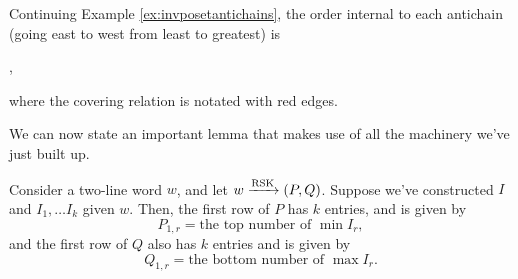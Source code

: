 \documentclass{article}
\DeclareMathOperator{\RSK}{RSK}
\newcommand{\rskarrow}{\ensuremath\xrightarrow{\RSK}}
\begin{document}
\begin{example}
    Continuing Example \ref{ex:invposetantichains}, the order internal to each antichain (going east to west from least to greatest) is
    \begin{center}
        ,
    \end{center}
    where the covering relation is notated with red edges.
\end{example}

We can now state an important lemma that makes use of all the machinery we've just built up.

\begin{lemma}
    Consider a two-line word $w$, and let $w \rskarrow (P, Q)$.
    Suppose we've constructed $I$ and $I_1, \ldots I_k$ given $w$.
    Then, the first row of $P$ has $k$ entries, and is given by
    \[
        P_{1,r} = \text{the top number of }\min I_r,
    \]
    and the first row of $Q$ also has $k$ entries and is given by
    \[
        Q_{1,r} = \text{the bottom number of }\max I_r.
    \]
\end{lemma}
\end{document}
